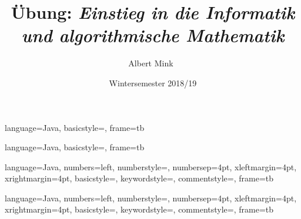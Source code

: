 {
  language=Java,
  basicstyle=\ttfamily, %
  frame=tb  %
}

{
  language=Java,
  basicstyle=\small\ttfamily, %
  frame=tb  %
}

{
  language=Java,
  numbers=left,
  numberstyle=\color{grey}\ttfamily,
  numbersep=4pt, %
  xleftmargin=4pt, %
  xrightmargin=4pt, %
  basicstyle=\ttfamily, %
  keywordstyle=\color{green},  %
  commentstyle=\color{blue}\ttfamily, %
  frame=tb  %
}

{
  language=Java,
  numbers=left,
  numberstyle=\color{grey}\ttfamily,
  numbersep=4pt, %
  xleftmargin=4pt, %
  xrightmargin=4pt, %
  basicstyle=\small\ttfamily, %
  keywordstyle=\color{green},  %
  commentstyle=\color{blue}\ttfamily, %
  frame=tb  %
}




\title[Institut f\"ur Angewandte und Numerische Mathematik]%
 {\fontsize{15}{15}\selectfont{}
  \"Ubung:
  \textit{Einstieg in die Informatik}\\[1.5mm]
  \textit{\phantom{\"Ubung:}\; und algorithmische Mathematik}\\[1.5mm]
  }%
\author{\fontsize{9}{9}\selectfont{}
 Albert Mink\
  }
\date{Wintersemester 2018/19}%
\subject{}%

